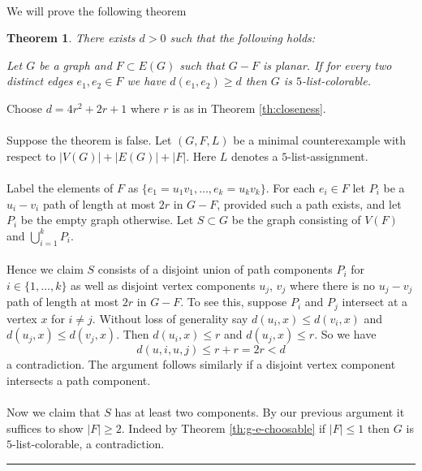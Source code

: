 \documentclass[letterpaper,12pt,oneside,onecolumn]{article}
\newenvironment{proof}{{\bf Proof:  }}{\hfill\rule{2mm}{2mm}}
\newtheorem{theorem}[fact]{Theorem}
\begin{document}
\paragraph{}
We will prove the following theorem
\begin{theorem}
	There exists $d>0$ such that the following holds:
	
	Let $G$ be a graph and $F \subset E(G)$ such that $G-F$ is planar. If for every two distinct edges $e_1, e_2 \in F$ we have $d(e_1, e_2) \geq d$ then $G$ is $5$-list-colorable.
\end{theorem}
\begin{proof}
Choose $d = 4r^2+2r+1$ where $r$ is as in Theorem \ref{th:closeness}.
\paragraph{}
Suppose the theorem is false. Let $(G,F,L)$ be a minimal counterexample with respect to $|V(G)| + |E(G)| + |F|$. Here $L$ denotes a $5$-list-assignment.
\paragraph{}
Label the elements of $F$ as $\{e_1=u_1v_1, \dots, e_k = u_kv_k\}$. For each $e_i \in F$ let $P_i$ be a $u_i-v_i$ path of length at most $2r$ in $G-F$, provided such a path exists, and let $P_i$ be the empty graph otherwise. Let $S\subset G$ be the graph consisting of $V(F)$ and $\bigcup_{i=1}^k P_i$.
\paragraph{}
Hence we claim $S$ consists of a disjoint union of path components $P_i$ for $i \in \{1,\dots, k\}$ as well as disjoint vertex components $u_j$, $v_j$ where there is no $u_j-v_j$ path of length at most $2r$ in $G-F$. To see this, suppose $P_i$ and $P_j$ intersect at a vertex $x$ for $i\neq j$. Without loss of generality say $d(u_i,x) \leq d(v_i,x)$ and $d(u_j, x) \leq d(v_j, x)$. Then $d(u_i, x) \leq r$ and $d(u_j,x) \leq r$. So we have
$$d(u,i,u,j) \leq r + r = 2r < d$$
a contradiction. The argument follows similarly if a disjoint vertex component intersects a path component.
\paragraph{}
Now we claim that $S$ has at least two components. By our previous argument it suffices to show $|F| \geq 2$. Indeed by Theorem \ref{th:g-e-choosable} if $|F| \leq 1$ then $G$ is $5$-list-colorable, a contradiction.

\end{proof}
\end{document}
